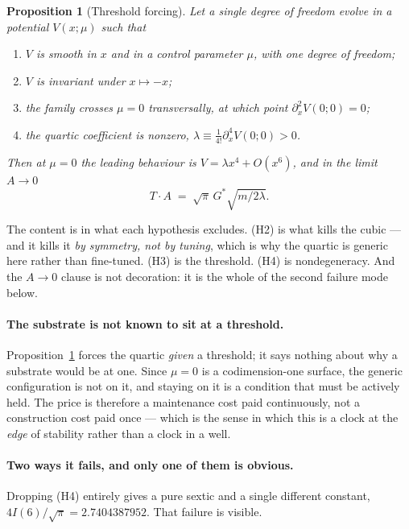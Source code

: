 \documentclass[11pt,a4paper]{article}
\newcommand{\Gstar}{{G^{*}}}
\theoremstyle{definition}
\theoremstyle{plain}
\newtheorem{proposition}{Proposition}
\theoremstyle{remark}
\begin{document}
\begin{proposition}[Threshold forcing]
\label{prop:threshold}
Let a single degree of freedom evolve in a potential $V(x;\mu)$ such that
\begin{enumerate}\itemsep2pt
\item[\textnormal{(H1)}] $V$ is smooth in $x$ and in a control parameter
  $\mu$, with one degree of freedom;
\item[\textnormal{(H2)}] $V$ is invariant under $x\mapsto-x$;
\item[\textnormal{(H3)}] the family crosses $\mu=0$ transversally, at
  which point $\partial_x^2V(0;0)=0$;
\item[\textnormal{(H4)}] the quartic coefficient is nonzero,
  $\lambda \equiv \tfrac1{4!}\partial_x^4V(0;0) > 0$.
\end{enumerate}
Then at $\mu=0$ the leading behaviour is $V = \lambda x^4 + O(x^6)$, and
\emph{in the limit $A\to0$}
\[
T\cdot A \;=\; \sqrt{\pi}\,\Gstar\sqrt{m/2\lambda}.
\]
\end{proposition}

The content is in what each hypothesis excludes. (H2) is what kills the
cubic --- and it kills it \emph{by symmetry, not by tuning}, which is why
the quartic is generic here rather than fine-tuned. (H3) is the
threshold. (H4) is nondegeneracy. And the $A\to0$ clause is not
decoration: it is the whole of the second failure mode below.

\paragraph{The substrate is not known to sit at a threshold.}
Proposition~\ref{prop:threshold} forces the quartic \emph{given} a
threshold; it says nothing about why a substrate would be at one. Since
$\mu=0$ is a codimension-one surface, the generic configuration is not on
it, and staying on it is a condition that must be actively held. The
price is therefore a maintenance cost paid continuously, not a
construction cost paid once --- which is the sense in which this is a
clock at the \emph{edge} of stability rather than a clock in a well.

\paragraph{Two ways it fails, and only one of them is obvious.}
Dropping (H4) entirely gives a pure sextic and a single different
constant, $4I(6)/\sqrt\pi = 2.7404387952$. That failure is visible.
\end{document}
